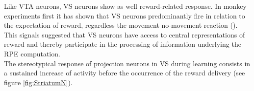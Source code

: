 Like VTA neurons, VS neurons show as well reward-related response. In monkey experiments first it has shown that VS neurons predominantly fire in relation to the expectation of reward, regardless the movement no-movement reaction (\cite{Schultz1992}). This signals suggested that VS neurons have access to central representations of reward and thereby participate in the processing of information underlying the RPE computation.\\The stereotypical response of projection neurons in VS during learning consists in a sustained increase of activity before the occurrence of the reward delivery (see figure \ref{fig:StriatumN}).
